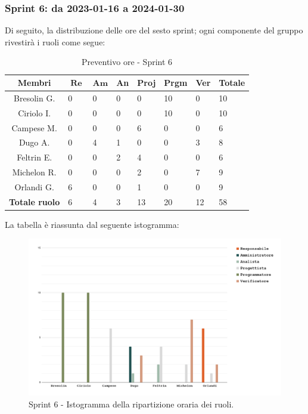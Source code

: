 \documentclass[10pt, a4paper]{article}
\begin{document}
{{{{{{{{{{{{{\subsubsection{Sprint 6: da 2023-01-16 a 2024-01-30}
Di seguito, la distribuzione delle ore del sesto sprint; ogni componente del gruppo rivestirà i ruoli come segue:
\begin{table}[H]
\begin{tabularx}{\textwidth}{c|X|X|X|X|X|X|X}
        \textbf{Membri} & $\operatorname{\textbf{Re}}$ & $\mathrm{\textbf{Am}}$ & \textbf{An} & \textbf{Proj} & \textbf{Prgm} & \textbf{Ver} & \textbf{Totale} \\
        \hline Bresolin G. & 0 & 0 & 0 & 0 & \cellcolor{primarycolor}10 & 0 & 10 \\
        \hline Ciriolo I.  & 0 & 0 & 0 & 0 & \cellcolor{primarycolor}10 & 0 & 10 \\
        \hline Campese M.  & 0 & 0 & 0 & \cellcolor{primarycolor}6 & 0 & 0 & 6 \\
        \hline Dugo A.     & 0 & \cellcolor{primarycolor}4 & 1 & 0 & 0 & 3 & 8 \\
        \hline Feltrin E.  & 0 & 0 & 2 & \cellcolor{primarycolor}4 & 0 & 0 & 6 \\
        \hline Michelon R. & 0 & 0 & 0 & 2 & 0 & \cellcolor{primarycolor}7 & 9 \\
        \hline Orlandi G.  & \cellcolor{primarycolor}6 & 0 & 0 & 1 & 0 & 0 & 9 \\
        \hline
        \textbf{Totale ruolo} & 6 & 4 & 3 & 13 & 20 & 12 & 58 
    \end{tabularx}
    \caption{Preventivo ore - Sprint 6}
    \end{table}

La tabella è riassunta dal seguente istogramma:
 \begin{figure}[H]
        \centering        
        \includegraphics[width=15.5cm]{istogrammi/istogramma_6_periodo.png}
        \caption{Sprint 6 - Istogramma della ripartizione oraria dei ruoli. }
    \end{figure}


}}}}}}}}}}}}}
\end{document}
